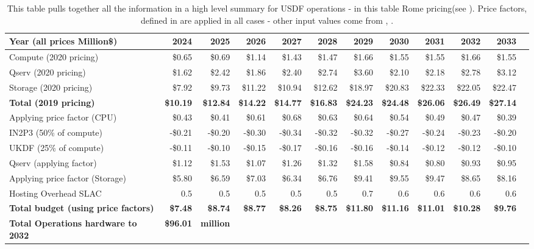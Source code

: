 \tiny \begin{longtable} { |p{}  |r  |r  |r  |r  |r  |r  |r  |r  |r  |r  |r |} 
\caption{This table pulls together all the information in a high level summary for USDF operations - in this table Rome pricing(see ). Price factors, defined in  are applied in all cases - other input values come from , .
 \label{tab:opsSumUSDF}}\\ 
\hline 
\textbf{Year  (all prices Million\$)}&\textbf{2024}&\textbf{2025}&\textbf{2026}&\textbf{2027}&\textbf{2028}&\textbf{2029}&\textbf{2030}&\textbf{2031}&\textbf{2032}&\textbf{2033} \\ \hline
{Compute (2020 pricing)}&{\$0.65}&{\$0.69}&{\$1.14}&{\$1.43}&{\$1.47}&{\$1.66}&{\$1.55}&{\$1.55}&{\$1.66}&{\$1.55} \\ \hline
{Qserv (2020 pricing)}&{\$1.62}&{\$2.42}&{\$1.86}&{\$2.40}&{\$2.74}&{\$3.60}&{\$2.10}&{\$2.18}&{\$2.78}&{\$3.12} \\ \hline
{Storage (2020 pricing)}&{\$7.92}&{\$9.73}&{\$11.22}&{\$10.94}&{\$12.62}&{\$18.97}&{\$20.83}&{\$22.33}&{\$22.05}&{\$22.47} \\ \hline
\textbf{Total (2019 pricing)}&\textbf{\$10.19}&\textbf{\$12.84}&\textbf{\$14.22}&\textbf{\$14.77}&\textbf{\$16.83}&\textbf{\$24.23}&\textbf{\$24.48}&\textbf{\$26.06}&\textbf{\$26.49}&\textbf{\$27.14} \\ \hline
{Applying price factor (CPU)}&{\$0.43}&{\$0.41}&{\$0.61}&{\$0.68}&{\$0.63}&{\$0.64}&{\$0.54}&{\$0.49}&{\$0.47}&{\$0.39} \\ \hline
{IN2P3 (50\% of compute)}&{-\$0.21}&{-\$0.20}&{-\$0.30}&{-\$0.34}&{-\$0.32}&{-\$0.32}&{-\$0.27}&{-\$0.24}&{-\$0.23}&{-\$0.20} \\ \hline
{UKDF (25\% of compute)}&{-\$0.11}&{-\$0.10}&{-\$0.15}&{-\$0.17}&{-\$0.16}&{-\$0.16}&{-\$0.14}&{-\$0.12}&{-\$0.12}&{-\$0.10} \\ \hline
{Qserv (applying factor)}&{\$1.12}&{\$1.53}&{\$1.07}&{\$1.26}&{\$1.32}&{\$1.58}&{\$0.84}&{\$0.80}&{\$0.93}&{\$0.95} \\ \hline
{Applying price factor (Storage)}&{\$5.80}&{\$6.59}&{\$7.03}&{\$6.34}&{\$6.76}&{\$9.41}&{\$9.55}&{\$9.47}&{\$8.65}&{\$8.16} \\ \hline
{Hosting Overhead SLAC
}&{0.5}&{0.5}&{0.5}&{0.5}&{0.5}&{0.7}&{0.6}&{0.6}&{0.6}&{0.6} \\ \hline
\textbf{Total budget (using price factors)}&\textbf{\$7.48}&\textbf{\$8.74}&\textbf{\$8.77}&\textbf{\$8.26}&\textbf{\$8.75}&\textbf{\$11.80}&\textbf{\$11.16}&\textbf{\$11.01}&\textbf{\$10.28}&\textbf{\$9.76} \\ \hline
\textbf{Total Operations hardware to 2032 }&\textbf{\$96.01}&\textbf{million}&&&&&&&& \\ \hline
\end{longtable} \normalsize
